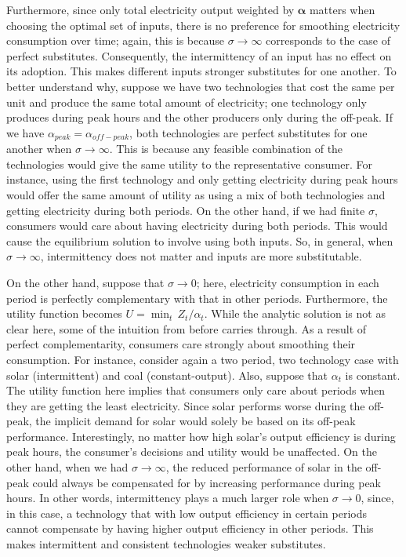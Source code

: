\documentclass[11pt,a4paper,leqno]{extarticle}
\begin{document}
	Furthermore, since only total electricity output weighted by $\boldsymbol{\alpha}$ matters when choosing the optimal set of inputs, there is no preference for smoothing electricity consumption over time; again, this is because $\sigma \to \infty$ corresponds to the case of perfect substitutes. Consequently, the intermittency of an input has no effect on its adoption. This makes different inputs stronger substitutes for one another. To better understand why, suppose we have two technologies that cost the same per unit and produce the same total amount of electricity; one technology only produces during peak hours and the other producers only during the off-peak. If we have $\alpha_{peak} = \alpha_{off-peak}$, both technologies are perfect substitutes for one another when $\sigma \to \infty$. This is because any feasible combination of the technologies would give the same utility to the representative consumer. For instance, using the first technology and only getting electricity during peak hours would offer the same amount of utility as using a mix of both technologies and getting electricity during both periods. On the other hand, if we had finite $\sigma$, consumers would care about having electricity during both periods. This would cause the equilibrium solution to involve using both inputs. So, in general, when $\sigma \to \infty$, intermittency does not matter and inputs are more substitutable. 
	
	On the other hand, suppose that $\sigma \to 0$; here, electricity consumption in each period is perfectly complementary with that in other periods. Furthermore, the utility function becomes $U = \min_t \, Z_t/\alpha_t$. While the analytic solution is not as clear here, some of the intuition from before carries through. As a result of perfect complementarity, consumers care strongly about smoothing their consumption. For instance, consider again a two period, two technology case with solar (intermittent) and coal (constant-output). Also, suppose that $\alpha_t$ is constant. The utility function here implies that consumers only care about periods when they are getting the least electricity. Since solar performs worse during the off-peak, the implicit demand for solar would solely be based on its off-peak performance. Interestingly, no matter how high solar's output efficiency is during peak hours, the consumer's decisions and utility would be unaffected. On the other hand, when we had $\sigma \to \infty$, the reduced performance of solar in the off-peak could always be compensated for by increasing performance during peak hours. In other words, intermittency plays a much larger role when $\sigma \to 0$, since, in this case, a technology that with low output efficiency in certain periods cannot compensate by having higher output efficiency in other periods. This makes intermittent and consistent technologies weaker substitutes. 
	
\end{document}
